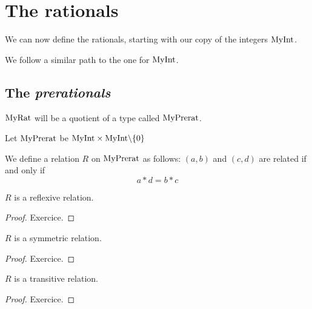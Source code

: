 \chapter{The rationals}

We can now define the rationals, starting with our copy of the integers $\mathrm{MyInt}$.

We follow a similar path to the one for $\mathrm{MyInt}$.

\section{The \emph{prerationals}}

$\mathrm{MyRat}$ will be a quotient of a type called $\mathrm{MyPrerat}$.

\begin{definition}
    \label{MyPrerat}
    \leanok
    Let $\mathrm{MyPrerat}$ be $\mathrm{MyInt} \times \mathrm{MyInt} \backslash \{0\}$
\end{definition}

\begin{definition}
    \label{MyPrerat.R}
    \leanok
We define a relation $R$ on $\mathrm{MyPrerat}$ as follows: $(a,b)$ and $(c, d)$ are related if and only if
\[
a * d = b * c
\]
\end{definition}

\begin{lemma}
$R$ is a reflexive relation.
    \label{MyPrerat.R_refl}
    \leanok
\end{lemma}
\begin{proof}
    \leanok
    Exercice.
\end{proof}

\begin{lemma}
$R$ is a symmetric relation.
    \label{MyPrerat.R_symm}
    \leanok
\end{lemma}
\begin{proof}
    \leanok
    Exercice.
\end{proof}

\begin{lemma}
$R$ is a transitive relation.
    \label{MyPrerat.R_trans}
    \leanok
\end{lemma}
\begin{proof}
    \leanok
    Exercice.
\end{proof}

